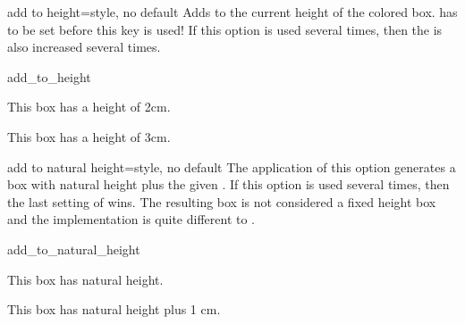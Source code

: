 \clearpage

\begin{docTcbKey}[][doc new=2014-11-07]{add to height}{=}{style, no default}
  Adds  to the current height of the colored box.
   has to be set before this key is used!
  If this option is used several times, then the  is
  also increased several times.
\begin{exdispExample}{add_to_height}

\begin{tcolorbox}
  This box has a height of 2cm.
\end{tcolorbox}
\begin{tcolorbox}[add to height=1cm]
  This box has a height of 3cm.
\end{tcolorbox}
\end{exdispExample}
\end{docTcbKey}


\begin{docTcbKey}[][doc new=2016-02-16]{add to natural height}{=}{style, no default}
  The application of this option generates a box with natural height plus
  the given . If this option is used several times, then the
  last setting of  wins. The resulting box is not considered
  a fixed height box and the implementation is quite different to
  .
\begin{exdispExample}{add_to_natural_height}

\begin{tcolorbox}
  This box has natural height.
\end{tcolorbox}
\begin{tcolorbox}[add to natural height=1cm]
  This box has natural height plus 1 cm.
\end{tcolorbox}
\end{exdispExample}
\end{docTcbKey}


